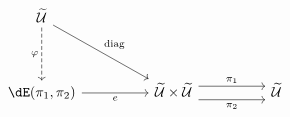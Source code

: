 \[\begin{tikzcd}
	\Tm \\
	\\
	{\dE(\pi_{1},\pi_{2})} && {\Tm \times \Tm} && \Tm
	\arrow["{\pi_{1}}", shift left=2, from=3-3, to=3-5]
	\arrow["{\pi_{2}}"', shift right=2, from=3-3, to=3-5]
	\arrow["e"', from=3-1, to=3-3]
	\arrow["{\mathrm{diag}}", from=1-1, to=3-3]
	\arrow["\varphi"', dashed, from=1-1, to=3-1]
\end{tikzcd}\]